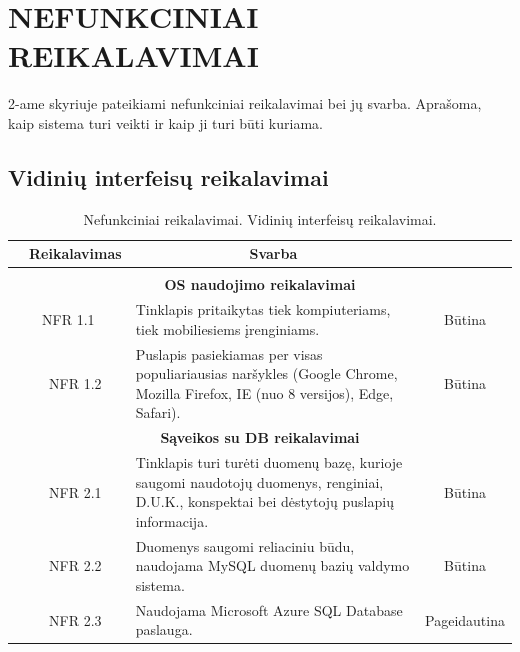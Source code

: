 \documentclass{VUMIFPSkursinis}
\begin{document}
\section{NEFUNKCINIAI REIKALAVIMAI}
2-ame skyriuje pateikiami nefunkciniai reikalavimai bei jų svarba. Aprašoma, kaip sistema turi veikti ir kaip ji turi būti kuriama.
\subsection{Vidinių interfeisų reikalavimai}
	\begin{table}[H]
	\caption{Nefunkciniai reikalavimai. Vidinių interfeisų reikalavimai.}
	\begin{tabular}{|p{1cm}|p{1cm}|p{}|p{}|}
	\hline 
\rowcolor{gray!50}
		\multicolumn{2}{|c|}{{\bfseries Kodas}}&
		\multicolumn{1}{c|}{{\bfseries Reikalavimas}}&
		\multicolumn{1}{c|}{{\bfseries Svarba}}\\
\hline
\rowcolor{lightgray}
\multicolumn{4}{|c|}{Vidinių interfeisų reikalavimai}\\		

\hline
\multicolumn{4}{|c|}{\bfseries OS naudojimo reikalavimai}\\	

\hline
	\multicolumn{2}{|c|}{NFR 1.1}&
	{Tinklapis pritaikytas tiek kompiuteriams, tiek mobiliesiems įrenginiams.
}&		
	\multicolumn{1}{c|}{Būtina}\\
\hline
	\multicolumn{1}{|c}{}&
	\multicolumn{1}{c|}{NFR 1.2}&
	{Puslapis pasiekiamas per visas populiariausias naršykles
(Google Chrome, Mozilla Firefox, IE (nuo 8 versijos), Edge, Safari).
}&		
	\multicolumn{1}{c|}{Būtina}\\

	\hline
\multicolumn{4}{|c|}{\bfseries Sąveikos su DB reikalavimai}\\		
				
	\hline
		\multicolumn{1}{|c}{}&
		\multicolumn{1}{c|}{NFR 2.1}&
		{Tinklapis turi turėti duomenų bazę, kurioje saugomi naudotojų duomenys, renginiai, D.U.K., konspektai bei dėstytojų puslapių informacija.
		}&
		\multicolumn{1}{c|}{Būtina}\\	
\hline		
		\multicolumn{1}{|c}{}&
		\multicolumn{1}{c|}{NFR 2.2}&
		{Duomenys saugomi reliaciniu būdu, naudojama MySQL
duomenų bazių valdymo sistema.
		}&
		\multicolumn{1}{c|}{Būtina}\\		
		
		\hline		
		\multicolumn{1}{|c}{}&
		\multicolumn{1}{c|}{NFR 2.3}&
		{Naudojama Microsoft Azure SQL Database paslauga.
		}&
		\multicolumn{1}{c|}{Pageidautina}\\	
		

\end{tabular}
\end{table}
\end{document}
